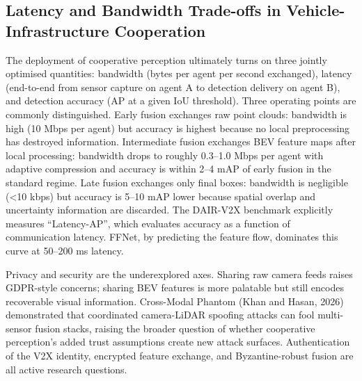 \subsection{Latency and Bandwidth Trade-offs in Vehicle-Infrastructure Cooperation}\label{latency-and-bandwidth-trade-offs-in-vehicle-infrastructure-cooperation}

The deployment of cooperative perception ultimately turns on three jointly optimised quantities: bandwidth (bytes per agent per second exchanged), latency (end-to-end from sensor capture on agent A to detection delivery on agent B), and detection accuracy (AP at a given IoU threshold). Three operating points are commonly distinguished. Early fusion exchanges raw point clouds: bandwidth is high (10 Mbps per agent) but accuracy is highest because no local preprocessing has destroyed information. Intermediate fusion exchanges BEV feature maps after local processing: bandwidth drops to roughly 0.3--1.0 Mbps per agent with adaptive compression and accuracy is within 2--4 mAP of early fusion in the standard regime. Late fusion exchanges only final boxes: bandwidth is negligible (\textless10 kbps) but accuracy is 5--10 mAP lower because spatial overlap and uncertainty information are discarded. The DAIR-V2X benchmark explicitly measures ``Latency-AP'', which evaluates accuracy as a function of communication latency. FFNet, by predicting the feature flow, dominates this curve at 50--200 ms latency.

Privacy and security are the underexplored axes. Sharing raw camera feeds raises GDPR-style concerns; sharing BEV features is more palatable but still encodes recoverable visual information. Cross-Modal Phantom (Khan and Hasan, 2026) demonstrated that coordinated camera-LiDAR spoofing attacks can fool multi-sensor fusion stacks, raising the broader question of whether cooperative perception's added trust assumptions create new attack surfaces. Authentication of the V2X identity, encrypted feature exchange, and Byzantine-robust fusion are all active research questions.

